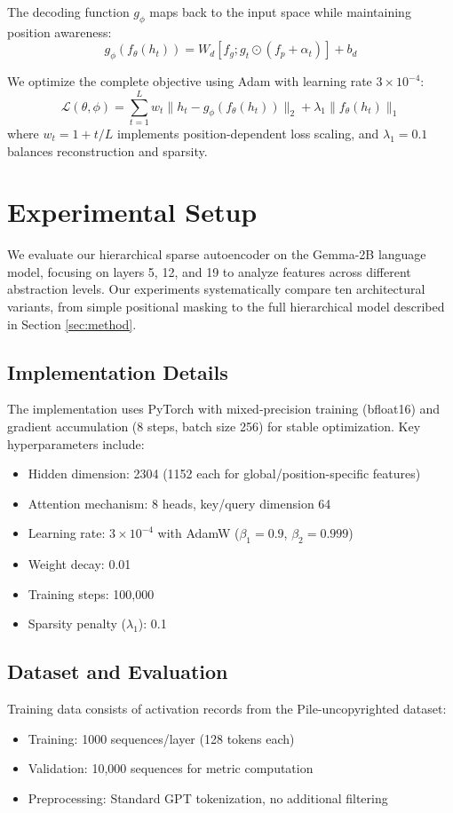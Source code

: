 \documentclass{article} %
\begin{document}
The decoding function $g_\phi$ maps back to the input space while maintaining position awareness:
\begin{equation}
    g_\phi(f_\theta(h_t)) = W_d[f_g; g_t \odot (f_p + \alpha_t)] + b_d
\end{equation}

We optimize the complete objective using Adam with learning rate $3 \times 10^{-4}$:
\begin{equation}
    \mathcal{L}(\theta, \phi) = \sum_{t=1}^L w_t\|h_t - g_\phi(f_\theta(h_t))\|_2 + \lambda_1\|f_\theta(h_t)\|_1
\end{equation}
where $w_t = 1 + t/L$ implements position-dependent loss scaling, and $\lambda_1 = 0.1$ balances reconstruction and sparsity.

\section{Experimental Setup}
\label{sec:experimental}

We evaluate our hierarchical sparse autoencoder on the Gemma-2B language model, focusing on layers 5, 12, and 19 to analyze features across different abstraction levels. Our experiments systematically compare ten architectural variants, from simple positional masking to the full hierarchical model described in Section \ref{sec:method}.

\subsection{Implementation Details}
The implementation uses PyTorch with mixed-precision training (bfloat16) and gradient accumulation (8 steps, batch size 256) for stable optimization. Key hyperparameters include:

\begin{itemize}
    \item Hidden dimension: 2304 (1152 each for global/position-specific features)
    \item Attention mechanism: 8 heads, key/query dimension 64
    \item Learning rate: $3 \times 10^{-4}$ with AdamW ($\beta_1=0.9$, $\beta_2=0.999$)
    \item Weight decay: 0.01
    \item Training steps: 100,000
    \item Sparsity penalty ($\lambda_1$): 0.1
\end{itemize}

\subsection{Dataset and Evaluation}
Training data consists of activation records from the Pile-uncopyrighted dataset:
\begin{itemize}
    \item Training: 1000 sequences/layer (128 tokens each)
    \item Validation: 10,000 sequences for metric computation
    \item Preprocessing: Standard GPT tokenization, no additional filtering
\end{itemize}
\end{document}
